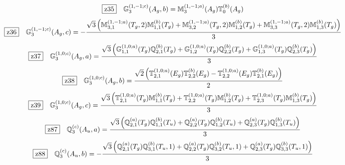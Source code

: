 \documentclass[fleqn,10pt,landscape]{jsarticle}
\begin{document}
\begin{dmath*}
\hspace*{3mm}\fbox{z35}\quad \mathbb{G}_{3}^{(1,-1;c)}(A_{g},b)=\mathbb{M}_{3}^{(1,-1;a)}(A_{g}) \mathbb{T}_{0}^{(b)}(A_{g})
\end{dmath*}
\begin{dmath*}
\hspace*{3mm}\fbox{z36}\quad \mathbb{G}_{3}^{(1,-1;c)}(A_{g},c)=- \frac{\sqrt{3} \left(\mathbb{M}_{3,1}^{(1,-1;a)}(T_{g},2) \mathbb{M}_{1,1}^{(b)}(T_{g}) + \mathbb{M}_{3,2}^{(1,-1;a)}(T_{g},2) \mathbb{M}_{1,2}^{(b)}(T_{g}) + \mathbb{M}_{3,3}^{(1,-1;a)}(T_{g},2) \mathbb{M}_{1,3}^{(b)}(T_{g})\right)}{3}
\end{dmath*}
\begin{dmath*}
\hspace*{3mm}\fbox{z37}\quad \mathbb{G}_{3}^{(1,0;c)}(A_{g},a)=\frac{\sqrt{3} \left(\mathbb{G}_{1,1}^{(1,0;a)}(T_{g}) \mathbb{Q}_{2,1}^{(b)}(T_{g}) + \mathbb{G}_{1,2}^{(1,0;a)}(T_{g}) \mathbb{Q}_{2,2}^{(b)}(T_{g}) + \mathbb{G}_{1,3}^{(1,0;a)}(T_{g}) \mathbb{Q}_{2,3}^{(b)}(T_{g})\right)}{3}
\end{dmath*}
\begin{dmath*}
\hspace*{3mm}\fbox{z38}\quad \mathbb{G}_{3}^{(1,0;c)}(A_{g},b)=\frac{\sqrt{2} \left(\mathbb{T}_{2,1}^{(1,0;a)}(E_{g}) \mathbb{T}_{2,2}^{(b)}(E_{g}) - \mathbb{T}_{2,2}^{(1,0;a)}(E_{g}) \mathbb{T}_{2,1}^{(b)}(E_{g})\right)}{2}
\end{dmath*}
\begin{dmath*}
\hspace*{3mm}\fbox{z39}\quad \mathbb{G}_{3}^{(1,0;c)}(A_{g},c)=\frac{\sqrt{3} \left(\mathbb{T}_{2,1}^{(1,0;a)}(T_{g}) \mathbb{M}_{1,1}^{(b)}(T_{g}) + \mathbb{T}_{2,2}^{(1,0;a)}(T_{g}) \mathbb{M}_{1,2}^{(b)}(T_{g}) + \mathbb{T}_{2,3}^{(1,0;a)}(T_{g}) \mathbb{M}_{1,3}^{(b)}(T_{g})\right)}{3}
\end{dmath*}
\begin{dmath*}
\hspace*{3mm}\fbox{z87}\quad \mathbb{Q}_{3}^{(c)}(A_{u},a)=\frac{\sqrt{3} \left(\mathbb{Q}_{2,1}^{(a)}(T_{g}) \mathbb{Q}_{1,1}^{(b)}(T_{u}) + \mathbb{Q}_{2,2}^{(a)}(T_{g}) \mathbb{Q}_{1,2}^{(b)}(T_{u}) + \mathbb{Q}_{2,3}^{(a)}(T_{g}) \mathbb{Q}_{1,3}^{(b)}(T_{u})\right)}{3}
\end{dmath*}
\begin{dmath*}
\hspace*{3mm}\fbox{z88}\quad \mathbb{Q}_{3}^{(c)}(A_{u},b)=- \frac{\sqrt{3} \left(\mathbb{Q}_{2,1}^{(a)}(T_{g}) \mathbb{Q}_{3,1}^{(b)}(T_{u},1) + \mathbb{Q}_{2,2}^{(a)}(T_{g}) \mathbb{Q}_{3,2}^{(b)}(T_{u},1) + \mathbb{Q}_{2,3}^{(a)}(T_{g}) \mathbb{Q}_{3,3}^{(b)}(T_{u},1)\right)}{3}
\end{dmath*}
\end{document}
